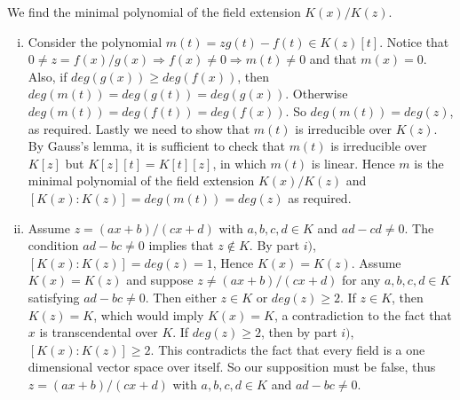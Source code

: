 \begin{solution} 
We find the minimal polynomial of the field extension $K(x)/K(z)$.
\begin{enumerate}[(i)]

\item Consider the polynomial $m(t) = zg(t) - f(t) \in K(z)[t]$. 
Notice that $0 \neq z = f(x)/g(x) \Longrightarrow f(x) \neq 0 \Longrightarrow m(t) \neq 0$
and that $m(x) = 0$. Also, if $deg(g(x)) \geq deg(f(x))$, 
then $deg(m(t)) = deg(g(t)) = deg(g(x))$.
Otherwise $deg(m(t)) = deg(f(t)) = deg(f(x))$. So $deg(m(t)) = deg(z)$,
as required. Lastly we need to show that $m(t)$ is irreducible over
$K(z)$. By Gauss's lemma, it is sufficient to check that $m(t)$ is 
irreducible over $K[z]$ but $K[z][t]=K[t][z]$, in which $m(t)$ is linear. 
Hence $m$ is the minimal polynomial of the field extension $K(x)/K(z)$ 
and $[K(x):K(z)] = deg(m(t)) = deg(z)$ as required.

\item Assume $z = (ax+b)/(cx + d)$ with $a,b,c,d \in K$ and 
$ad - cd \neq 0$. The condition $ad-bc \neq 0 $ implies that 
$z \notin K$. By part $i)$, $[K(x):K(z)] = deg(z) = 1$, Hence 
$K(x) = K(z)$. Assume $K(x) = K(z)$ and suppose $z \neq (ax+b)/(cx + d) $ 
for any $a,b,c,d \in K$ satisfying $ad - bc \neq 0$. Then 
either $z \in K$ or $deg(z) \geq 2$. If $z \in K$, then $K(z) = K$, 
which would imply $K(x) = K$, a contradiction to the fact 
that $x$ is transcendental over $K$. If $deg(z) \geq 2$, 
then by part $i)$, $[K(x):K(z)] \geq 2$. This contradicts the fact 
that every field is a one dimensional vector space over itself. 
So our supposition must be false, thus $z = (ax+b)/(cx+d)$ with 
$a,b,c,d \in K$ and $ad - bc \neq 0$.

\end{enumerate}
\end{solution}



